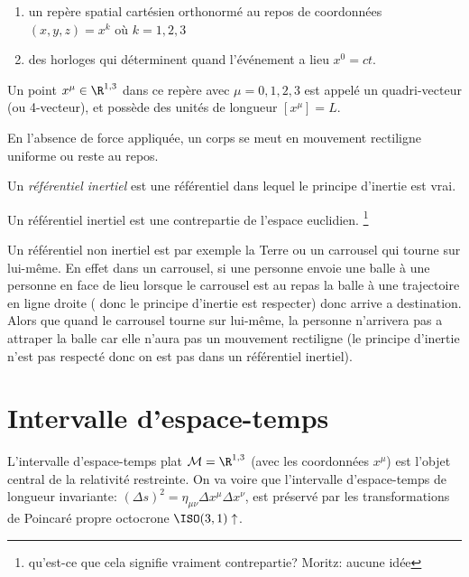 \begin{enumerate}
    \item un repère spatial cartésien orthonormé au repos de coordonnées $(x, y, z) = x^k$ où $k = 1, 2, 3$
    \item des horloges qui déterminent quand l'événement a lieu $x^0 = ct$. 
\end{enumerate}
Un point $x^\mu\in \R^{1,3}$ dans ce repère avec $\mu=0,1,2,3$ est appelé un quadri-vecteur (ou 4-vecteur), et possède des unités de longueur $[x^\mu ] = L$.
\begin{theoremframe}
\begin{rap}
    En l'absence de force appliquée, un corps se meut en mouvement rectiligne uniforme ou reste au repos.    
\end{rap}
\end{theoremframe}
\begin{theoremframe}
\begin{defi}
Un \emph{référentiel inertiel} est une référentiel dans lequel le principe d'inertie est vrai. 
\end{defi}
\end{theoremframe}
Un référentiel inertiel est une contrepartie de l'espace euclidien. \footnote{qu'est-ce que cela signifie vraiment contrepartie? Moritz: aucune idée }

Un référentiel non inertiel est par exemple la Terre ou un carrousel qui tourne sur lui-même. En effet dans un carrousel, si une personne envoie une balle à une personne en face de lieu lorsque le carrousel est au repas la balle à une trajectoire en ligne droite ( donc le principe d'inertie est respecter) donc arrive a destination. Alors que quand le carrousel tourne sur lui-même, la personne n'arrivera pas a attraper la balle car elle n'aura pas un mouvement rectiligne (le principe d'inertie n'est pas respecté donc on est pas dans un référentiel inertiel).

\section{Intervalle d'espace-temps}

L'intervalle d'espace-temps plat $\mathcal{M} = \R ^{1,3}$ (avec les coordonnées $x^{\mu}$) est l'objet central de la relativité restreinte. On va voire que l'intervalle d'espace-temps de longueur invariante: $(\Delta s)^2 = \eta _{\mu \nu}\Delta x^{\mu} \Delta x^{\nu} $, est préservé par les transformations de Poincaré propre octocrone $\ISO (3,1)\uparrow$.


